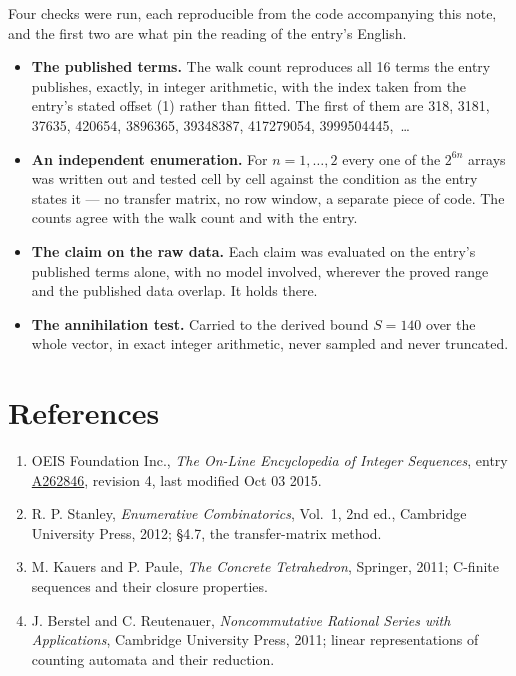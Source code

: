 \documentclass[11pt]{article}
\theoremstyle{definition}
\begin{document}
Four checks were run, each reproducible from the code accompanying this note, and the first two are what pin the reading of the entry's English.

\begin{itemize}

\item {\bfseries The published terms.} The walk count reproduces all 16 terms the entry publishes, exactly, in integer arithmetic, with the index taken from the entry's stated offset (1) rather than fitted. The first of them are 318, 3181, 37635, 420654, 3896365, 39348387, 417279054, 3999504445,~\dots

\item {\bfseries An independent enumeration.} For $n = 1,\dots,2$ every one of the $2^{6n}$ arrays was written out and tested cell by cell against the condition as the entry states it --- no transfer matrix, no row window, a separate piece of code. The counts agree with the walk count and with the entry.

\item {\bfseries The claim on the raw data.} Each claim was evaluated on the entry's published terms alone, with no model involved, wherever the proved range and the published data overlap. It holds there.

\item {\bfseries The annihilation test.} Carried to the derived bound $S = 140$ over the whole vector, in exact integer arithmetic, never sampled and never truncated.

\end{itemize}

\section{References}

\begin{enumerate}

\item OEIS Foundation Inc., \emph{The On-Line Encyclopedia of Integer Sequences}, entry \href{https://oeis.org/A262846}{A262846}, revision 4, last modified Oct 03 2015.

\item R. P. Stanley, \emph{Enumerative Combinatorics}, Vol.~1, 2nd ed., Cambridge University Press, 2012; \S4.7, the transfer-matrix method.

\item M. Kauers and P. Paule, \emph{The Concrete Tetrahedron}, Springer, 2011; C-finite sequences and their closure properties.

\item J. Berstel and C. Reutenauer, \emph{Noncommutative Rational Series with Applications}, Cambridge University Press, 2011; linear representations of counting automata and their reduction.

\end{enumerate}
\end{document}
